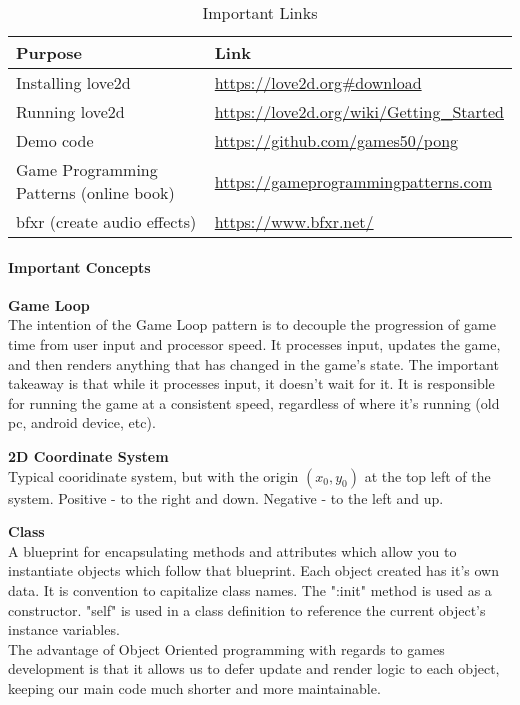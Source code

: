 \begin{table}[h]
\caption{Important Links}
\label{pong-important-links}
\begin{tabular}{ll}
\hline
Purpose           & Link                                     \\ \hline
Installing love2d & \url{https://love2d.org\#download}             \\ 
Running love2d    & \url{https://love2d.org/wiki/Getting\_Started} \\ 
Demo code         & \url{https://github.com/games50/pong}          \\ 
Game Programming Patterns (online book) & \url{https://gameprogrammingpatterns.com}  \\
bfxr (create audio effects) & \url{https://www.bfxr.net/} \\
\hline
\end{tabular}
\end{table}


\paragraph{Important Concepts}

\begin{definition}
\textbf{Game Loop}
\\
The intention of the Game Loop pattern is to decouple the progression of game time from user input and processor speed. It processes input, updates the game, and then renders anything that has changed in the game's state. The important takeaway is that while it processes input, it doesn't wait for it. It is responsible for running the game at a consistent speed, regardless of where it's running (old pc, android device, etc).
\end{definition}

\begin{definition}
\textbf{2D Coordinate System}
\\
Typical cooridinate system, but with the origin $(x_0, y_0)$ at the top left of the system. Positive - to the right and down. Negative - to the left and up.
\end{definition}

\begin{definition}
\textbf{Class}
\\
A blueprint for encapsulating methods and attributes which allow you to instantiate objects which follow that blueprint. Each object created has it's own data. It is convention to capitalize class names. The ":init" method is used as a constructor. "self" is used in a class definition to reference the current object's instance variables.
\\
The advantage of Object Oriented programming with regards to games development is that it allows us to defer update and render logic to each object, keeping our main code much shorter and more maintainable.
\end{definition}

